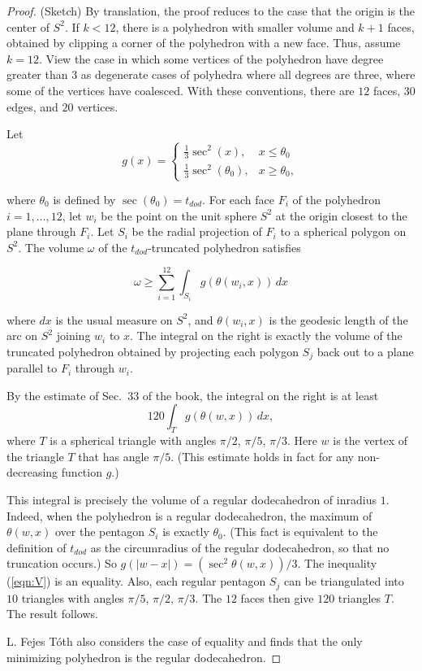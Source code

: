 \documentclass{article} %
\begin{document}
\begin{proof}
 (Sketch) By translation, the proof reduces to the case that the
origin is the center of $S^2$. If $k<12$, there is a polyhedron with
smaller volume and $k+1$ faces, obtained by clipping a corner of the
polyhedron with a new face. Thus, assume $k=12$. View the case in
which some vertices of the polyhedron have degree greater than $3$ as
degenerate cases of polyhedra where all degrees are three, where some
of the vertices have coalesced. With these conventions, there are $12$
faces, $30$ edges, and $20$ vertices.

Let 
  $$g(x) = \begin{cases}
             \frac13 \sec^2 (x), & x \le \theta_0\\
             \frac13 \sec^2 (\theta_0), & x \ge \theta_0,
           \end{cases}$$

where $\theta_0$ is defined by $\sec(\theta_0) = t_{dod}$. For each
face $F_i$ of the polyhedron $i=1,\ldots, 12$, let $w_i$ be the point
on the unit sphere $S^2$ at the origin closest to the plane through
$F_i$. Let $S_i$ be the radial projection of $F_i$ to a spherical
polygon on $S^2$. The volume $\omega$ of the $t_{dod}$-truncated
polyhedron satisfies

\begin{equation}\label{eqn:V}
  \omega \ge \sum_{i=1}^{12} \int_{S_i} g(\theta(w_i,x))\,dx
\end{equation}

where $dx$ is the usual measure on $S^2$, and $\theta(w_i,x)$ is the
geodesic length of the arc on $S^2$ joining $w_i$ to $x$. The integral
on the right is exactly the volume of the truncated polyhedron
obtained by projecting each polygon $S_j$ back out to a plane parallel
to $F_i$ through $w_i$.

By the estimate of Sec.~33 of the book, the integral on the right is
at least
$$
120 \int_{T} g(\theta(w,x))\, dx,
$$
where $T$ is a spherical triangle with angles $\pi/2$, $\pi/5$,
$\pi/3$. Here $w$ is the vertex of the triangle $T$ that has angle
$\pi/5$. (This estimate holds in fact for any non-decreasing function
$g$.)

This integral is precisely the volume of a regular dodecahedron of
inradius $1$. Indeed, when the polyhedron is a regular dodecahedron,
the maximum of $\theta(w,x)$ over the pentagon $S_i$ is exactly
$\theta_0$. (This fact is equivalent to the definition of $t_{dod}$ as
the circumradius of the regular dodecahedron, so that no truncation
occurs.) So $g(|w-x|) = (\sec^2\theta(w,x))/3$. The inequality
(\ref{eqn:V}) is an equality. Also, each regular pentagon $S_j$ can be
triangulated into $10$ triangles with angles $\pi/5$, $\pi/2$,
$\pi/3$. The $12$ faces then give $120$ triangles $T$. The result
follows.

L. Fejes T\'oth also considers the case of equality and finds that the
only minimizing polyhedron is the regular dodecahedron.
\end{proof}
\end{document}
